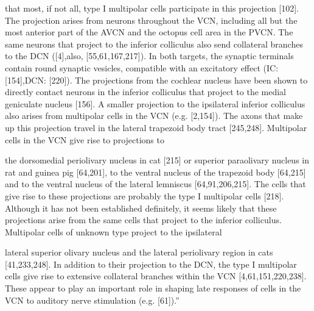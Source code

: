 \documentclass[10pt,a4paper]{article}
\begin{document}
that most, if not all, type I multipolar cells participate in this projection
[102]. The projection arises from neurons throughout the VCN, including all but
the most anterior part of the AVCN and the octopus cell area in the PVCN. The
same neurons that project to the inferior colliculus also send collateral
branches to the DCN ([4],also, [55,61,167,217]). In both targets, the synaptic
terminals contain round synaptic vesicles, compatible with an excitatory effect
(IC: [154],DCN: [220]). The projections from the cochlear nucleus have been
shown to directly contact neurons in the inferior colliculus that project to the
medial geniculate nucleus [156]. A smaller projection to the ipsilateral
inferior colliculus also arises from multipolar cells in the VCN
(e.g. [2,154]). The axons that make up this projection travel in the lateral
trapezoid body tract [245,248]. Multipolar cells in the VCN give rise to
projections to

the dorsomedial periolivary nucleus in cat [215] or superior paraolivary nucleus
in rat and guinea pig [64,201], to the ventral nucleus of the trapezoid body
[64,215] and to the ventral nucleus of the lateral lemniscus
[64,91,206,215]. The cells that give rise to these projections are probably the
type I multipolar cells [218]. Although it has not been established definitely,
it seems likely that these projections arise from the same cells that project to
the inferior colliculus. Multipolar cells of unknown type project to the
ipsilateral

lateral superior olivary nucleus and the lateral periolivary region in cats
[41,233,248]. In addition to their projection to the DCN, the type I multipolar
cells give rise to extensive collateral branches within the VCN
[4,61,151,220,238]. These appear to play an important role in shaping late
responses of cells in the VCN to auditory nerve stimulation
(e.g. [61]).{\textquotedblright}

\subsection{\citep{WangSachs:1992}}
\end{document}
